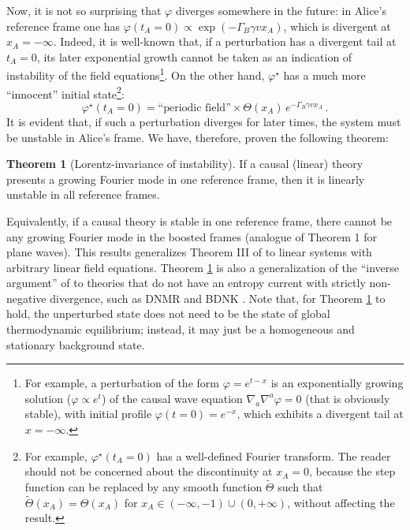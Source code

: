 \documentclass[a4paper, amsfonts, amssymb, amsmath, reprint, showkeys,  twoside, onecolumn,notitlepage,nofootinbib]{revtex4-1}
\theoremstyle{definition}
\theoremstyle{theorem}
\newtheorem{theorem}{Theorem}
\begin{document}
Now, it is not so surprising that $\varphi$ diverges somewhere in the future: in Alice's reference frame one has $\varphi(t_A=0) \propto \exp(-\Gamma_B \gamma v x_A)$, which is divergent at $x_A=-\infty$. Indeed, it is well-known that, if a perturbation has a divergent tail at $t_A=0$, its later exponential growth cannot be taken as an indication of instability of the field equations\footnote{For example, a perturbation of the form $\varphi=e^{t-x}$ is an exponentially growing solution ($\varphi \propto e^t$) of the causal wave equation $\nabla_a \nabla^a \varphi=0$ (that is obviously stable), with initial profile $\varphi(t=0)=e^{-x}$, which exhibits a divergent tail at $x=-\infty$.}. On the other hand, $\varphi^\star$ has a much more ``innocent'' initial state\footnote{For example, $\varphi^\star(t_A=0)$ has a well-defined Fourier transform. The reader should not be concerned about the discontinuity at $x_A=0$, because the step function can be replaced by any smooth function $\tilde{\Theta}$ such that $\tilde{\Theta}(x_A)=\Theta(x_A)$ for $x_A \in(-\infty, -1) \cup (0,+\infty)$, without affecting the result.}:
\begin{equation}
\varphi^\star(t_A=0) = \text{``periodic field''} \times  \Theta(x_A) \, e^{ -\Gamma_B \gamma v x_A} \, .
\end{equation} 
It is evident that, if such a perturbation diverges for later times, the system must be unstable in Alice's frame. We have, therefore, proven the following theorem:
\begin{theorem}[Lorentz-invariance of instability]\label{theo2}
If a causal (linear) theory presents a growing Fourier mode in one reference frame, then it is linearly unstable in all reference frames. 
\end{theorem}
Equivalently, if a causal theory is stable in one reference frame, there cannot be any growing Fourier mode in the boosted frames (analogue of Theorem 1 for plane waves). This results generalizes Theorem III of \citet{BemficaDNDefinitivo2020} to linear systems with arbitrary linear field equations. Theorem \ref{theo2} is also a generalization of the ``inverse argument'' of \citet{GavassinoCausality2021} to theories that do not have an entropy current with strictly non-negative divergence, such as DNMR \cite{Denicol2012Boltzmann} and BDNK \cite{Bemfica2019_conformal1}. Note that, for Theorem \ref{theo2} to hold, the unperturbed state does not need to be the state of global thermodynamic equilibrium; instead, it may just be a homogeneous and stationary background state. 
\end{document}
